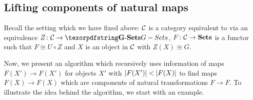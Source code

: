 \subsection{Lifting components of natural maps}

Recall the setting which we have fixed above: $\mathcal{C}$ is a category equivalent to \Gset{} via an equivalence $Z \colon \Ccal \to \Gset$, $F\colon \mathcal{C} \to {\ensuremath{{\operatorname{\mathbf{Sets}}}}}$ is a functor such that $F \cong U \circ Z$ and $X$ is an object in $\mathcal{C}$ with $Z(X) \cong G$.

Now, we present an algorithm which recursively uses information of maps $F(X') \to F(X')$ for objects $X'$ with ${\lvert F(X')\rvert} < {\lvert F(X)\rvert}$ to find maps $F(X) \to F(X)$ which are components of natural transformations $F \to F$. To illustrate the idea behind the algorithm, we start with an example.

